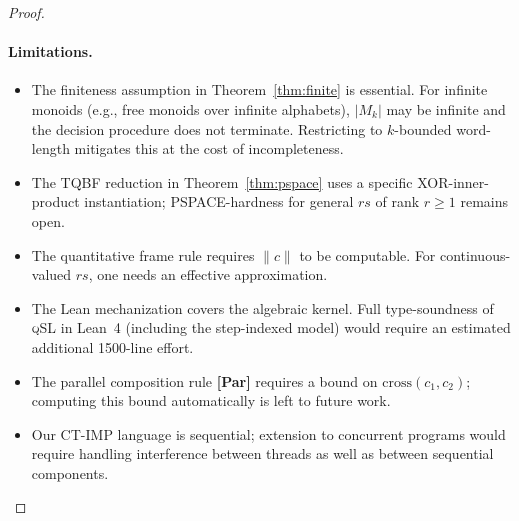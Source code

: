 \documentclass[acmsmall,sigplan,anonymous,review,screen]{acmart}
\theoremstyle{plain}
\theoremstyle{definition}
\newcommand{\qSL}{\textsc{qSL}\xspace}
\newcommand{\rs}{\mathit{rs}}
\newcommand{\norm}[1]{\|#1\|}
\begin{document}
\begin{proof}
\paragraph{Limitations.}
\begin{itemize}[itemsep=2pt]
  \item The finiteness assumption in Theorem~\ref{thm:finite} is
    essential.  For infinite monoids (e.g., free monoids over infinite
    alphabets), $|M_k|$ may be infinite and the decision procedure does
    not terminate.  Restricting to $k$-bounded word-length mitigates this
    at the cost of incompleteness.
  \item The TQBF reduction in Theorem~\ref{thm:pspace} uses a specific
    XOR-inner-product instantiation; PSPACE-hardness for general $\rs$ of
    rank $r \geq 1$ remains open.
  \item The quantitative frame rule requires $\norm{c}$ to be computable.
    For continuous-valued $\rs$, one needs an effective approximation.
  \item The Lean mechanization covers the algebraic kernel.  Full
    type-soundness of \qSL in Lean~4 (including the step-indexed model)
    would require an estimated additional 1500-line effort.
  \item The parallel composition rule \textbf{[Par]} requires a bound on
    $\mathrm{cross}(c_1, c_2)$; computing this bound automatically is
    left to future work.
  \item Our CT-IMP language is sequential; extension to concurrent
    programs would require handling interference between threads as well
    as between sequential components.
\end{itemize}


\end{proof}
\end{document}
